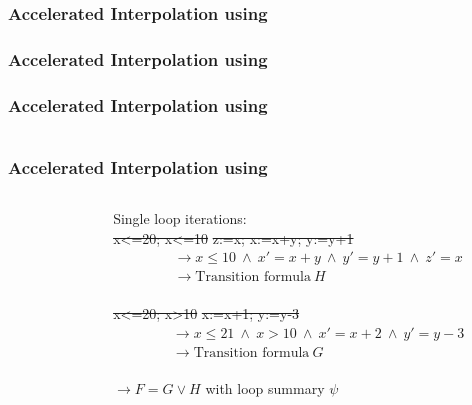 \begin{frame}[t]
	\frametitle{Accelerated Interpolation using \qvasr}
	\resizebox{\textwidth}{!}{}
\end{frame}

\begin{frame}[t]	\frametitle{Accelerated Interpolation using \qvasr}
	\resizebox{0.5\textwidth}{!}{}
\end{frame}

\begin{frame}[t]
	\frametitle{Accelerated Interpolation using \qvasr}
	\begin{columns}
		\begin{column}{0.35\textwidth}
			\resizebox{0.8\textwidth}{!}{}
		\end{column}
		\begin{column}{0.55\textwidth}
			\onslide<2-5>
			\resizebox{0.4\textwidth}{!}{}
		\end{column}
	\end{columns}
\end{frame}

\begin{frame}[t]
	\frametitle{Accelerated Interpolation using \qvasr}
	\begin{columns}
		\begin{column}{0.35\textwidth}
			\resizebox{0.8\textwidth}{!}{}
		\end{column}
		\begin{column}{0.55\textwidth}
			Single loop iterations: \vspace*{0.25cm}\\
			\st{x<=20; x<=10} \st{z:=x; x:=x+y; y:=y+1}
			\onslide<2->
			{\small 
			\begin{align*}
			&\rightarrow x \leq 10\ \land\ x' = x + y\ \land\ y' = y + 1\ \land\ z' = x \\
			&\rightarrow \text{Transition formula}\ H 
			\end{align*}
			}%
			\onslide<1-> \\
			\vspace*{1cm}\st{x<=20; x>10} \st{x:=x+1; y:=y-3}
			\onslide<2->
			\begin{align*}
			&\rightarrow	x \leq 21\ \land\ x > 10\ \land\ x' = x + 2\ \land\ y' = y -3 \\
			&\rightarrow \text{Transition formula}\ G
			\end{align*}
			\onslide<3-> \\
			\vspace*{1cm}
			$\rightarrow F = G \lor H$ \onslide<4-> with loop summary \color<4->{red} $\psi$
		\end{column}
	\end{columns}
\end{frame}

